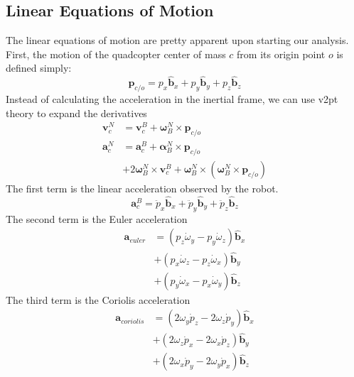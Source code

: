 \documentclass[lettersize,journal]{IEEEtran}
\begin{document}
\subsection{Linear Equations of Motion}
The linear equations of motion are pretty apparent upon starting our analysis.
First, the motion of the quadcopter center of mass $c$ from its origin point $o$ is defined simply:
\begin{equation}
  \mathbf{p}_{c/o} = p_x \mathbf{\hat{b}}_x + p_y \mathbf{\hat{b}}_y + p_z \mathbf{\hat{b}}_z
\end{equation}
Instead of calculating the acceleration in the inertial frame, we can use v2pt theory to expand the derivatives
\begin{align}
  \mathbf{v}^N_c &= \mathbf{v}^B_c + {\boldsymbol\omega^N_B}\times \mathbf{p}_{c/o} \\
  \mathbf{a}^N_c &= \mathbf{a}^B_c + {\boldsymbol\alpha^N_B}\times\mathbf{p}_{c/o}\nonumber \\
  &+ 2{\boldsymbol\omega^N_B}\times \mathbf{v}^B_c + {\boldsymbol\omega^N_B} \times \left({\boldsymbol\omega^N_B} \times \mathbf{p}_{c/o}\right)
\end{align}
The first term is the linear acceleration observed by the robot.
\begin{equation}
  \mathbf{a}^B_c = \ddot{p}_x \mathbf{\hat{b}}_x + \ddot{p}_y \mathbf{\hat{b}}_y + \ddot{p}_z \mathbf{\hat{b}}_z
\end{equation}
The second term is the Euler acceleration
\begin{align}
  \mathbf{a}_{euler} &= %
  \left(p_z\dot\omega_y-p_y\dot\omega_z\right) \mathbf{\hat{b}}_x \nonumber \\
  &+ \left(p_x\dot\omega_z-p_z\dot\omega_x\right) \mathbf{\hat{b}}_y \nonumber \\
  &+ \left(p_y\dot\omega_x - p_x\dot\omega_y \right) \mathbf{\hat{b}}_z
\end{align}
The third term is the Coriolis acceleration
\begin{align}
  \mathbf{a}_{coriolis}
  &= \left(2\omega_y\dot{p}_z - 2\omega_z\dot{p}_y\right) \mathbf{\hat{b}}_x \nonumber \\
  &+ \left(2\omega_z\dot{p}_x - 2\omega_x\dot{p}_z\right) \mathbf{\hat{b}}_y \nonumber \\
  &+ \left(2\omega_x\dot{p}_y - 2\omega_y\dot{p}_x\right) \mathbf{\hat{b}}_z
\end{align}
\end{document}
